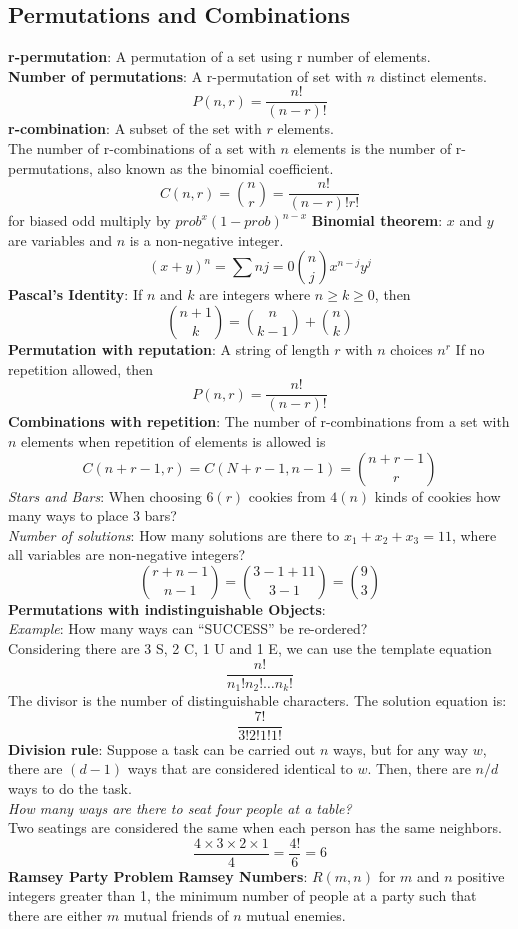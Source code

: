 \documentclass[letter]{article}
\begin{document}
\begin{multicols}{2}
  \subsection{Permutations and Combinations}\noindent
  \textbf{r-permutation}: A permutation of a set using r number of
  elements. \\
  \textbf{Number of permutations}: A r-permutation of set with $n$ distinct
  elements.
  $$P(n, r) = \dfrac{n!}{(n - r)!}$$
  \textbf{r-combination}: A subset of the set with $r$ elements. \\
  The number of r-combinations of a set with $n$ elements is the number of
  r-permutations, also known as the binomial coefficient.
  $$C(n, r) = \binom{n}{r} = \dfrac{n!}{(n - r)!r!}$$
  for biased odd multiply by ${prob}^x{(1-prob)}^{n-x}$
  \textbf{Binomial theorem}: $x$ and $y$ are variables and $n$ is a
  non-negative integer. \\
  $${(x + y)}^{n} = \sum{n}{j = 0}\binom{n}{j}x^{n - j}y^{j}$$
  \textbf{Pascal's Identity}: If $n$ and $k$ are integers where
  $n \geq k \geq 0$, then
  $$\binom{n + 1}{k}=\binom{n}{k - 1}+\binom{n}{k}$$
  \textbf{Permutation with reputation}: A string of length $r$ with $n$
  choices $n^r$ If no repetition allowed, then
  $$P(n, r) = \dfrac{n!}{(n - r)!}$$
  \textbf{Combinations with repetition}: The number of r-combinations from a
  set with $n$ elements when repetition of elements is allowed is
  $$C(n + r - 1, r)=C(N + r - 1, n - 1) = \binom{n + r - 1}{r}$$
  \textit{Stars and Bars}: When choosing $6(r)$ cookies from $4(n)$ kinds of
  cookies how many ways to place 3 bars? \\
  \textit{Number of solutions}: How many solutions are there to
  $x_1 + x_2 + x_3 = 11$, where all variables are non-negative integers? \\
  $$\binom{r + n - 1}{n - 1} = \binom{3 - 1 + 11}{3 - 1} = \binom{9}{3}$$
  \textbf{Permutations with indistinguishable Objects}: \\
  \textit{Example}: How many ways can ``SUCCESS'' be re-ordered? \\
  Considering there are 3 S, 2 C, 1 U and 1 E, we can use the template equation
  $$\frac{n!}{n_1!n_2! \ldots n_k!}$$
  The divisor is the number of distinguishable characters. The solution equation
  is:
  $$\frac{7!}{3!2!1!1!}$$
  \textbf{Division rule}: Suppose a task can be carried out $n$ ways, but for
  any way $w$, there are $(d - 1)$ ways that are considered identical to $w$.
  Then, there are $n/d$ ways to do the task. \\
  \textit{How many ways are there to seat four people at a table?} \\
  Two seatings are considered the same when each person has the same neighbors.
  $$\frac{4 \times 3 \times 2 \times 1}{4} = \frac{4!}{6} = 6$$
  \textbf{Ramsey Party Problem}
  \textbf{Ramsey Numbers}: $R(m, n)$ for $m$ and $n$ positive integers greater
  than 1, the minimum number of people at a party such that there are either $m$
  mutual friends of $n$ mutual enemies.


\end{multicols}
\end{document}

